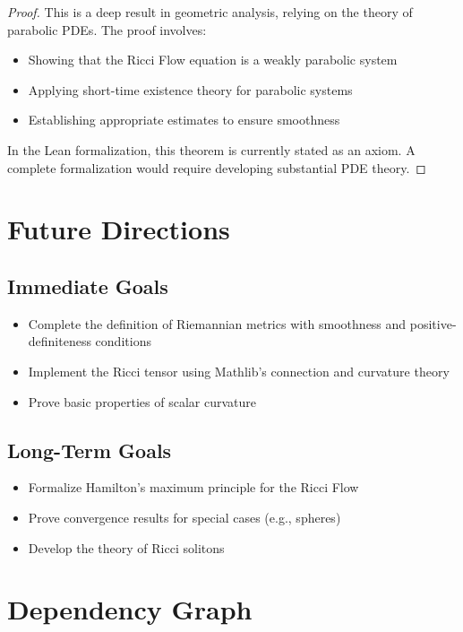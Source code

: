 \documentclass[a4paper]{report}
\theoremstyle{definition}
\theoremstyle{remark}
\begin{document}
\begin{proof}
\leanok
This is a deep result in geometric analysis, relying on the theory of parabolic PDEs. The proof involves:
\begin{itemize}
\item Showing that the Ricci Flow equation is a weakly parabolic system
\item Applying short-time existence theory for parabolic systems
\item Establishing appropriate estimates to ensure smoothness
\end{itemize}

In the Lean formalization, this theorem is currently stated as an axiom. A complete formalization would require developing substantial PDE theory.
\end{proof}

\chapter{Future Directions}

\section{Immediate Goals}
\begin{itemize}
\item Complete the definition of Riemannian metrics with smoothness and positive-definiteness conditions
\item Implement the Ricci tensor using Mathlib's connection and curvature theory
\item Prove basic properties of scalar curvature
\end{itemize}

\section{Long-Term Goals}
\begin{itemize}
\item Formalize Hamilton's maximum principle for the Ricci Flow
\item Prove convergence results for special cases (e.g., spheres)
\item Develop the theory of Ricci solitons
\end{itemize}

\appendix

\chapter{Dependency Graph}
\end{document}
